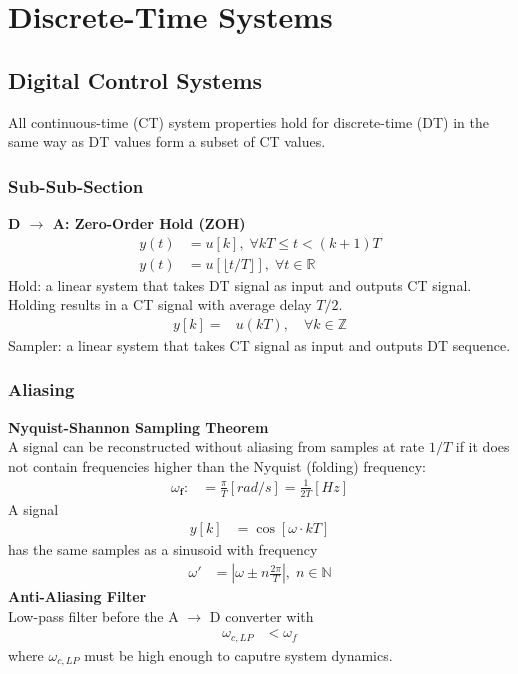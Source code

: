 \section{Discrete-Time Systems}
\subsection{Digital Control Systems}
All continuous-time (CT) system properties hold for discrete-time (DT) in the same way as DT values form a subset of CT values.
\subsubsection{Sub-Sub-Section}
\textbf{D $\rightarrow$ A: Zero-Order Hold (ZOH)}\\
\noindent\begin{align*}
    y(t) & =u[k], \; \forall kT \le t < (k+1)T                 \\
    y(t) & =u[\lfloor t/T\rfloor], \; \forall t \in \mathbb{R}
\end{align*}
Hold: a linear system that takes DT signal as input and outputs CT signal.\\
Holding results in a CT signal with average delay $T/2$.
\noindent\begin{align*}
    y[k]= & u(kT),\quad\forall k\in\mathbb{Z}
\end{align*}
Sampler: a linear system that takes CT signal as input and outputs DT sequence.\\
\subsubsection{Aliasing}
\textbf{Nyquist-Shannon Sampling Theorem}\\
A signal can be reconstructed without aliasing from samples at rate $1/T$ if it does not contain frequencies higher than the Nyquist (folding) frequency:
\noindent\begin{align*}
    \omega_{\mathbf{f}}: & =\frac\pi T[rad/s]=\frac1{2T}[Hz]
\end{align*}
A signal
\noindent\begin{align*}
    y[k] & =\cos[\omega\cdot kT]
\end{align*}
has the same samples as a sinusoid with frequency
\noindent\begin{align*}
    \omega' & =\left|\omega\pm n\frac{2\pi}{T}\right|,\; n\in\mathbb{N}
\end{align*}
%
\textbf{Anti-Aliasing Filter}\\
Low-pass filter before the A $\rightarrow$ D converter with
\noindent\begin{align*}
    \omega_{c,LP} & < \omega_f
\end{align*}
where $\omega_{c,LP}$ must be high enough to caputre system dynamics.
%
%
